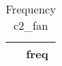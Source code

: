 \begin{table}[htbp]\centering
\def\sym#1{\ifmmode^{#1}\else\(^{#1}\)\fi}
\caption{Frequency c2\_fan \label{tab:"label"}}
\begin{tabular*}{0.9\hsize}{@{\hskip\tabcolsep\extracolsep\fill}l*{1}{c}}
\toprule
                                &     freq\\
\midrule
\bottomrule
\end{tabular*}
\end{table}
